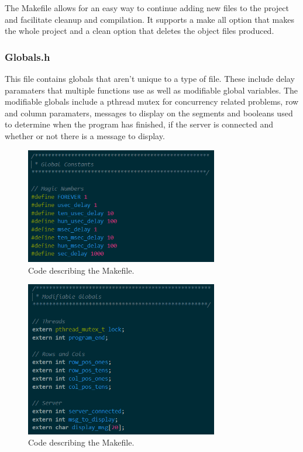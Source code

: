 \documentclass[a4paper,10pt]{article}
\begin{document}
The Makefile allows for an easy way to continue adding new files to the project and facilitate cleanup and compilation. It supports a make all option that makes the whole project and a clean option that deletes the object files produced.

\subsubsection{Globals.h}
This file contains globals that aren't unique to a type of file. These include delay paramaters that multiple functions use as well as modifiable global variables. The modifiable globals include a pthread mutex for concurrency related problems, row and column paramaters, messages to display on the segments and booleans used to determine when the program has finished, if the server is connected and whether or not there is a message to display.
\begin{figure}[H]
  \centering
      \includegraphics[width=0.75\textwidth]{Assets/global_constants.png}
  \caption{Code describing the Makefile.}
\end{figure}

\begin{figure}[H]
  \centering
      \includegraphics[width=0.75\textwidth]{Assets/modifiable_globals.png}
  \caption{Code describing the Makefile.}
\end{figure}
\end{document}
